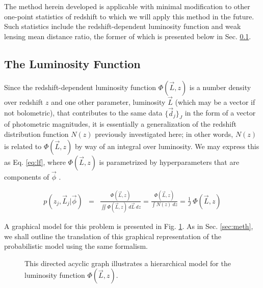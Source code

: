 \documentclass[preprint]{aastex}
\begin{document}
The method herein developed is applicable with minimal modification to other one-point statistics of redshift to which we will apply this method in the future.  Such statistics include the redshift-dependent luminosity function and weak lensing mean distance ratio, the former of which is presented below in Sec. \ref{sec:lf}.

\clearpage
\subsection{The Luminosity Function}
\label{sec:lf}

Since the redshift-dependent luminosity function $\Phi(\vec{L},z)$ is a number density over redshift $z$ and one other parameter, luminosity $\vec{L}$ (which may be a vector if not bolometric), that contributes to the same data $\{\vec{d}_{j}\}_{J}$ in the form of a vector of photometric magnitudes, it is essentially a generalization of the redshift distribution function $N(z)$ previously investigated here; in other words, $N(z)$ is related to $\Phi(\vec{L},z)$ by way of an integral over luminosity.   We may express this as Eq. \ref{eq:lf}, where $\Phi(\vec{L},z)$ is parametrized by hyperparameters that are components of $\vec{\phi}$ .

\begin{eqnarray}
\label{eq:lf}
p(z_{j},\vec{L}_{j}|\vec{\phi}) &=& \frac{\Phi(\vec{L},z)}{\iint \Phi(\vec{L},z)\ d\vec{L}\ dz} = \frac{\Phi(\vec{L},z)}{\int N(z)\ dz} = \frac{1}{J}\ \Phi(\vec{L},z)
\end{eqnarray}

A graphical model for this problem is presented in Fig. \ref{fig:lf}.  As in Sec. \ref{sec:meth}, we shall outline the translation of this graphical representation of the probabilistic model using the same formalism.

\begin{figure}
\vspace{0.5cm}
\begin{center}
\caption{This directed acyclic graph illustrates a hierarchical model for the luminosity function $\Phi(\vec{L},z)$.}
\label{fig:lf}
\end{center}
\end{figure}
\end{document}

